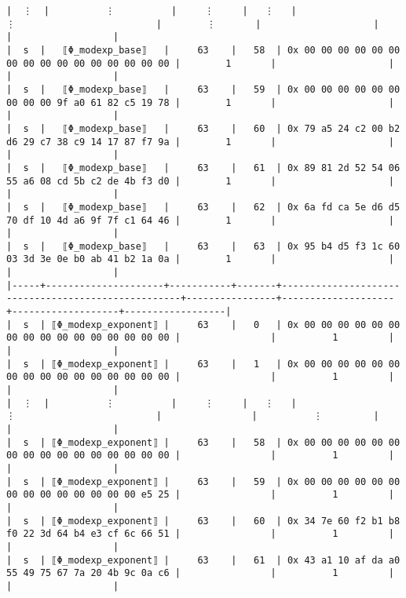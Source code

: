 \documentclass[varwidth=\maxdimen,margin=0.5cm,multi={verbatim}]{standalone}
\begin{document}
\begin{verbatim}
|  ⋮  |          ⋮          |     ⋮     |   ⋮   |                          ⋮                         |        ⋮       |                    |                   |                  |
|  s  |   ⟦Φ_modexp_base⟧   |     63    |   58  | 0x 00 00 00 00 00 00 00 00 00 00 00 00 00 00 00 00 |        1       |                    |                   |                  |
|  s  |   ⟦Φ_modexp_base⟧   |     63    |   59  | 0x 00 00 00 00 00 00 00 00 00 9f a0 61 82 c5 19 78 |        1       |                    |                   |                  |
|  s  |   ⟦Φ_modexp_base⟧   |     63    |   60  | 0x 79 a5 24 c2 00 b2 d6 29 c7 38 c9 14 17 87 f7 9a |        1       |                    |                   |                  |
|  s  |   ⟦Φ_modexp_base⟧   |     63    |   61  | 0x 89 81 2d 52 54 06 55 a6 08 cd 5b c2 de 4b f3 d0 |        1       |                    |                   |                  |
|  s  |   ⟦Φ_modexp_base⟧   |     63    |   62  | 0x 6a fd ca 5e d6 d5 70 df 10 4d a6 9f 7f c1 64 46 |        1       |                    |                   |                  |
|  s  |   ⟦Φ_modexp_base⟧   |     63    |   63  | 0x 95 b4 d5 f3 1c 60 03 3d 3e 0e b0 ab 41 b2 1a 0a |        1       |                    |                   |                  |
|-----+---------------------+-----------+-------+----------------------------------------------------+----------------+--------------------+-------------------+------------------|
|  s  | ⟦Φ_modexp_exponent⟧ |     63    |   0   | 0x 00 00 00 00 00 00 00 00 00 00 00 00 00 00 00 00 |                |          1         |                   |                  |
|  s  | ⟦Φ_modexp_exponent⟧ |     63    |   1   | 0x 00 00 00 00 00 00 00 00 00 00 00 00 00 00 00 00 |                |          1         |                   |                  |
|  ⋮  |          ⋮          |     ⋮     |   ⋮   |                          ⋮                         |                |          ⋮         |                   |                  |
|  s  | ⟦Φ_modexp_exponent⟧ |     63    |   58  | 0x 00 00 00 00 00 00 00 00 00 00 00 00 00 00 00 00 |                |          1         |                   |                  |
|  s  | ⟦Φ_modexp_exponent⟧ |     63    |   59  | 0x 00 00 00 00 00 00 00 00 00 00 00 00 00 00 e5 25 |                |          1         |                   |                  |
|  s  | ⟦Φ_modexp_exponent⟧ |     63    |   60  | 0x 34 7e 60 f2 b1 b8 f0 22 3d 64 b4 e3 cf 6c 66 51 |                |          1         |                   |                  |
|  s  | ⟦Φ_modexp_exponent⟧ |     63    |   61  | 0x 43 a1 10 af da a0 55 49 75 67 7a 20 4b 9c 0a c6 |                |          1         |                   |                  |

\end{verbatim}
\end{document}
